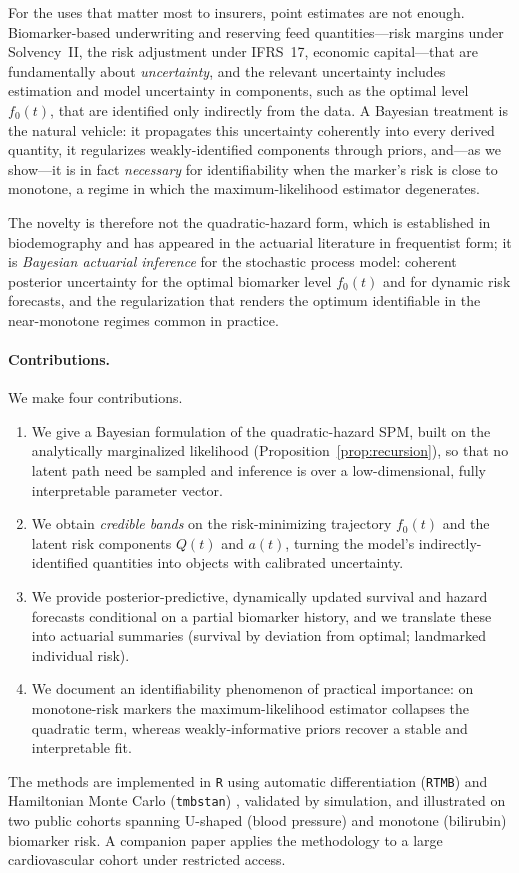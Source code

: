 \documentclass[review,3p,times]{elsarticle}
\newcommand{\fzero}{f_0}
\begin{document}
For the uses that matter most to insurers, point estimates are not enough.
Biomarker-based underwriting and reserving feed quantities---risk margins under
Solvency~II, the risk adjustment under IFRS~17, economic capital---that are
fundamentally about \emph{uncertainty}, and the relevant uncertainty includes
estimation and model uncertainty in components, such as the optimal level
$\fzero(t)$, that are identified only indirectly from the data. A Bayesian
treatment is the natural vehicle: it propagates this uncertainty coherently into
every derived quantity, it regularizes weakly-identified components through
priors, and---as we show---it is in fact \emph{necessary} for identifiability when
the marker's risk is close to monotone, a regime in which the maximum-likelihood
estimator degenerates.

The novelty is therefore not the quadratic-hazard form, which is established in
biodemography and has appeared in the actuarial literature in frequentist form;
it is \emph{Bayesian actuarial inference} for the stochastic process model:
coherent posterior uncertainty for the optimal biomarker level $\fzero(t)$ and for
dynamic risk forecasts, and the regularization that renders the optimum
identifiable in the near-monotone regimes common in practice.

\paragraph{Contributions.} We make four contributions.
\begin{enumerate}
\item We give a Bayesian formulation of the quadratic-hazard SPM, built on the
analytically marginalized likelihood (Proposition~\ref{prop:recursion}), so that
no latent path need be sampled and inference is over a low-dimensional, fully
interpretable parameter vector.
\item We obtain \emph{credible bands} on the risk-minimizing trajectory
$\fzero(t)$ and the latent risk components $Q(t)$ and $a(t)$, turning the model's
indirectly-identified quantities into objects with calibrated uncertainty.
\item We provide posterior-predictive, dynamically updated survival and hazard
forecasts conditional on a partial biomarker history, and we translate these into
actuarial summaries (survival by deviation from optimal; landmarked individual
risk).
\item We document an identifiability phenomenon of practical importance: on
monotone-risk markers the maximum-likelihood estimator collapses the quadratic
term, whereas weakly-informative priors recover a stable and interpretable fit.
\end{enumerate}
The methods are implemented in \texttt{R} using automatic differentiation
(\texttt{RTMB}) and Hamiltonian Monte Carlo (\texttt{tmbstan})
\citep{TMB2016,RTMB,tmbstan2018}, validated by simulation, and illustrated on two
public cohorts spanning U-shaped (blood pressure) and monotone (bilirubin)
biomarker risk. A companion paper applies the methodology to a large cardiovascular
cohort under restricted access.
\end{document}

